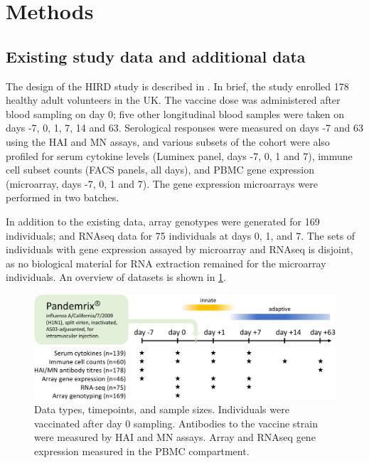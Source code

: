 \section{Methods}

\subsection{Existing  study data and additional data}
\label{subsec:hird_dge_studyDesign}

The design of the \gls{HIRD} study is described in \autocite{sobolev2016AdjuvantedInfluenzaH1N1Vaccination}.
In brief, the study enrolled 178 healthy adult volunteers in the UK.
The vaccine dose was administered after blood sampling on day 0; five other longitudinal blood samples were taken on days -7, 0, 1, 7, 14 and 63.
Serological responses were measured on days -7 and 63 using the \gls{HAI} and \gls{MN} assays, and various subsets of the cohort were also profiled for serum cytokine levels (Luminex panel, days -7, 0, 1 and 7), immune cell subset counts (\gls{FACS} panels, all days), and \gls{PBMC} gene expression (microarray, days -7, 0, 1 and 7).
The gene expression microarrays were performed in two batches.

In addition to the existing data, array genotypes were generated for 169 individuals; and \gls{RNAseq} data for 75 individuals at days 0, 1, and 7.
The sets of individuals with gene expression assayed by microarray and \gls{RNAseq} is disjoint, as no biological material for RNA extraction remained for the microarray individuals.
An overview of datasets is shown in \cref{fig:hird_design}.

\begin{figure}
    \includegraphics[width=1.0\textwidth]{mainmatter/figures/chapter_02/graphics_ashg19/hird_design-crop.pdf}
    \caption{Data types, timepoints, and sample sizes. Individuals were vaccinated after day 0 sampling. Antibodies to the vaccine strain were measured by \gls{HAI} and \gls{MN} assays. Array and \gls{RNAseq} gene expression measured in the \gls{PBMC} compartment.}
    \label{fig:hird_design}
\end{figure}

